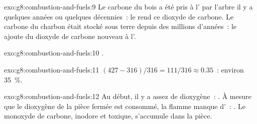 \begin{solution}{exo:g8:combustion-and-fuels:9}
Le carbone du bois a été pris à l' par l'arbre il y a quelques années
ou quelques décennies~: le  rend ce dioxyde de carbone. Le carbone
du charbon était stocké sous terre depuis des millions d'années~: le
 ajoute du dioxyde de carbone nouveau à l'.
\end{solution}

\begin{solution}{exo:g8:combustion-and-fuels:10}
.
\end{solution}

\begin{solution}{exo:g8:combustion-and-fuels:11}
$(427 - 316)/316 = 111/316 \approx 0.35$~: environ \qty{35}{\percent}.
\end{solution}

\begin{solution}{exo:g8:combustion-and-fuels:12}
Au début, il y a assez de dioxygène~: .
À mesure que le dioxygène de la pièce fermée est consommé, la flamme
manque d'~: . Le monoxyde de carbone,
inodore et toxique, s'accumule dans la pièce.
\end{solution}

